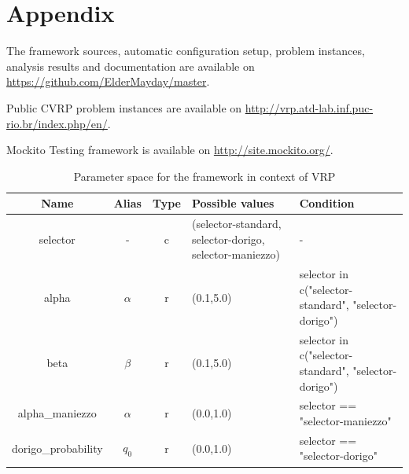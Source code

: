 \documentclass[11pt,a4paper,oneside]{book}
\begin{document}
\chapter{Appendix}

The framework sources, automatic configuration setup, problem instances, analysis results and documentation are available on \url{https://github.com/ElderMayday/master}.

Public CVRP problem instances are available on \url{http://vrp.atd-lab.inf.puc-rio.br/index.php/en/}.

Mockito Testing framework is available on \url{http://site.mockito.org/}.


\begin{table}[]
\centering
\caption{Parameter space for the framework in context of VRP}
\label{tbl:space}
\begin{tabular}{|c|c|c|p{4cm}|p{4cm}|}
\hline
\textbf{Name}  & \textbf{Alias}      & \textbf{Type} & \textbf{Possible values}                                                                & \textbf{Condition}                                                                                     \\ \hline
selector                        & -          & c    & (selector-standard, selector-dorigo, selector-maniezzo)                          & -                                                                                             \\ \hline
alpha                           & $\alpha$   & r    & (0.1,5.0)                                                                      & selector in c("selector-standard", "selector-dorigo")                                          \\ \hline
beta                            & $\beta$    & r    & (0.1,5.0)                                                                      & selector in c("selector-standard", "selector-dorigo")                                          \\ \hline
alpha\_maniezzo                 & $\alpha$   & r    & (0.0,1.0)                                                                      & selector == "selector-maniezzo"                                                               \\ \hline
dorigo\_probability             & $q_0$      & r    & (0.0,1.0)                                                                      & selector == "selector-dorigo"                                                                 \\ \hline

\end{tabular}
\end{table}
\end{document}
